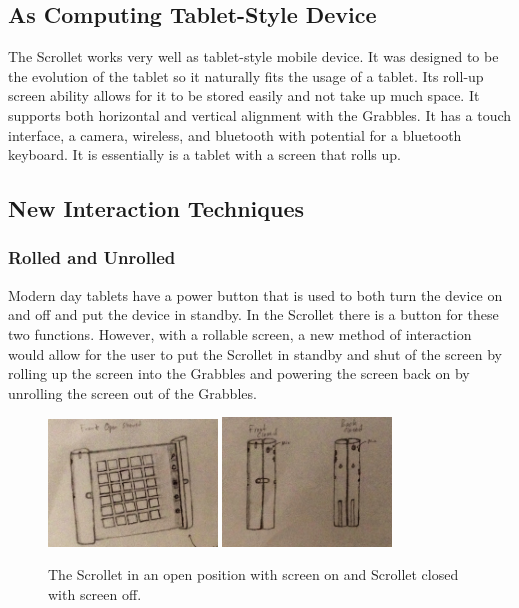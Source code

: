 \documentclass[a4paper]{article}
\begin{document}
\subsection{As Computing Tablet-Style Device}
The Scrollet works very well as tablet-style mobile device. It was designed to be the evolution of the tablet so it naturally fits the usage of a tablet. Its roll-up screen ability allows for it to be stored easily and not take up much space. It supports both horizontal and vertical alignment with the Grabbles. It has a touch interface, a camera, wireless, and bluetooth with potential for a bluetooth keyboard. It is essentially is a tablet with a screen that rolls up.

\subsection{New Interaction Techniques}
\subsubsection{Rolled and Unrolled}
Modern day tablets have a power button that is used to both turn the device on and off and put the device in standby. In the Scrollet there is a button for these two functions. However, with a rollable screen, a new method of interaction would allow for the user to put the Scrollet in standby and shut of the screen by rolling up the screen into the Grabbles and powering the screen back on by unrolling the screen out of the Grabbles.
\begin{figure}[H]
\centering
\includegraphics[width=0.4\textwidth]{scrolletopen.jpg}
\includegraphics[width=0.4\textwidth]{scrolletclosed.jpg}
\caption{The Scrollet in an open position with screen on and Scrollet closed with screen off.}
\end{figure}
\end{document}
